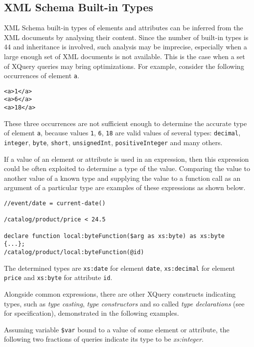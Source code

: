 \subsection{XML Schema Built-in Types}
XML Schema built-in types of elements and attributes can be inferred from the XML documents by analysing their content. Since the number of built-in types is 44 and inheritance is involved, such analysis may be imprecise, especially when a large enough set of XML documents is not available. This is the case when a set of XQuery queries may bring optimizations. For example, consider the following occurrences of element \texttt{a}.

\begin{verbatim}
<a>1</a>
<a>6</a>
<a>18</a>
\end{verbatim}

These three occurrences are not sufficient enough to determine the accurate type of element \texttt{a}, because values \texttt{1}, \texttt{6}, \texttt{18} are valid values of several types: \texttt{decimal}, \texttt{integer}, \texttt{byte}, \texttt{short}, \texttt{unsignedInt}, \texttt{positiveInteger} and many others.

If a value of an element or attribute is used in an expression, then this expression could be often exploited to determine a type of the value. Comparing the value to another value of a known type and supplying the value to a function call as an argument of a particular type are examples of these expressions as shown below.

\begin{verbatim}
//event/date = current-date()

/catalog/product/price < 24.5

declare function local:byteFunction($arg as xs:byte) as xs:byte
{...};
/catalog/product/local:byteFunction(@id)
\end{verbatim}

The determined types are \texttt{xs:date} for element \texttt{date}, \texttt{xs:decimal} for element \texttt{price} and \texttt{xs:byte} for attribute \texttt{id}.

Alongside common expressions, there are other XQuery constructs indicating types, such as \emph{type casting}, \emph{type constructors} and so called \emph{type declarations} (see \cite{w3c_xquery} for specification), demonstrated in the following examples.

Assuming variable \texttt{\$var} bound to a value of some element or attribute, the following two fractions of queries indicate its type to be \emph{xs:integer}.

